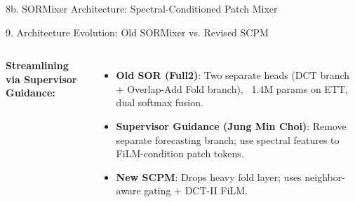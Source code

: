 \documentclass[aspectratio=169, 10pt]{beamer}
\begin{document}
\begin{frame}[t]{8b. SORMixer Architecture: Spectral-Conditioned Patch Mixer}
\centering
\vspace{-0.25cm}
\resizebox{!}{0.82\textheight}{%
}
\end{frame}

\begin{frame}{9. Architecture Evolution: Old SORMixer vs. Revised SCPM}
\begin{columns}[T]
\textbf{Streamlining via Supervisor Guidance:}
\begin{itemize}
    \item \textbf{Old SOR (Full2)}: Two separate heads (DCT branch + Overlap-Add Fold branch), ~1.4M params on ETT, dual softmax fusion.
    \item \textbf{Supervisor Guidance (Jung Min Choi)}: Remove separate forecasting branch; use spectral features to FiLM-condition patch tokens.
    \item \textbf{New SCPM}: Drops heavy fold layer; uses neighbor-aware gating + DCT-II FiLM.
\end{itemize}


\end{columns}
\end{frame}
\end{document}
